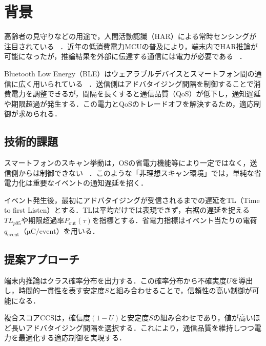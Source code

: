 \section{背景}

高齢者の見守りなどの用途で，人間活動認識（HAR）による常時センシングが注目されている~
．近年の低消費電力MCUの普及により，端末内でHAR推論が可能になったが，推論結果を外部に伝達する通信には電力が必要である~
．

Bluetooth Low Energy（BLE）はウェアラブルデバイスとスマートフォン間の通信に広く用いられている~
．送信側はアドバタイジング間隔を制御することで消費電力を調整できるが，間隔を長くすると通信品質（QoS）が低下し，通知遅延や期限超過が発生する．この電力とQoSのトレードオフを解決するため，適応制御が求められる．

\subsection{技術的課題}

スマートフォンのスキャン挙動は，OSの省電力機能等により一定ではなく，送信側からは制御できない~
．このような「非理想スキャン環境」では，単純な省電力化は重要なイベントの通知遅延を招く．

イベント発生後，最初にアドバタイジングが受信されるまでの遅延をTL（Time to first Listen）とする．TLは平均だけでは表現できず，右裾の遅延を捉える$TL_{p95}$や期限超過率$P_{\mathrm{out}}(\tau)$を指標とする．省電力指標はイベント当たりの電荷$q_{\mathrm{event}}$（$\si{\micro\coulomb}/\text{event}$）を用いる．

\subsection{提案アプローチ}

端末内推論はクラス確率分布を出力する．この確率分布から不確実度$U$を導出し，時間的一貫性を表す安定度$S$と組み合わせることで，信頼性の高い制御が可能になる．

複合スコアCCSは，確信度$(1-U)$と安定度$S$の組み合わせであり，値が高いほど長いアドバタイジング間隔を選択する．これにより，通信品質を維持しつつ電力を最適化する適応制御を実現する．

